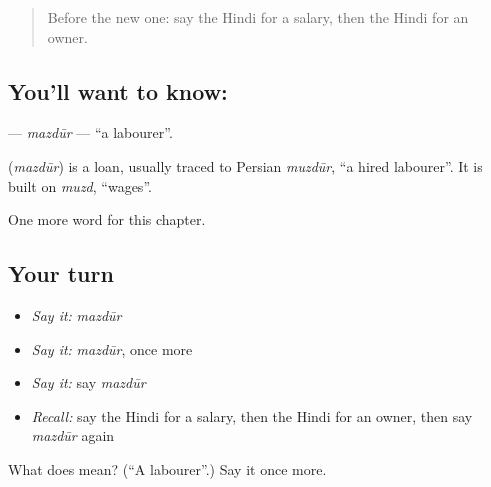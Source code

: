 \begin{quote}
Before the new one: say the Hindi for a salary, then the Hindi for an owner.
\end{quote}

\subsection*{You'll want to know: }
\textbf{} — \emph{mazdūr} — \textquotedblleft{}a labourer\textquotedblright{}.

\begin{cousinweb}
\textbf{} (\emph{mazdūr}) is a loan, usually traced to Persian \emph{muzdūr}, \textquotedblleft{}a hired labourer\textquotedblright{}. It is built on \emph{muzd}, \textquotedblleft{}wages\textquotedblright{}.
\end{cousinweb}

\begin{grammarlens}[title={What you've built}]
One more word for this chapter.
\end{grammarlens}

\subsection*{Your turn}
\begin{itemize}
\raggedright
  \item \emph{Say it:} \emph{mazdūr}
  \item \emph{Say it:} \emph{mazdūr}, once more
  \item \emph{Say it:} say \emph{mazdūr}
  \item \emph{Recall:} say the Hindi for a salary, then the Hindi for an owner, then say \emph{mazdūr} again
\end{itemize}

\begin{tcolorbox}[breakable,colback=teal!4,colframe=teal!35!black,title={Before you move on}]
What does  mean? (\textquotedblleft{}A labourer\textquotedblright{}.) Say it once more.
\end{tcolorbox}
